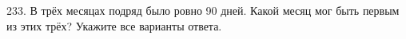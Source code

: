 233. В трёх месяцах подряд было ровно 90 дней. Какой месяц мог быть первым из этих трёх? Укажите все варианты ответа.\\
